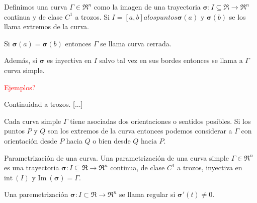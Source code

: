 \begin{definition}
    Definimos una curva $\Gamma\in\Re^n$ como la imagen de una trayectoria $\boldsymbol{\sigma}:I\subseteq\Re\to\Re^n$ continua y de clase $C^1$ a trozos. Si $I=[a,b] a los puntos \boldsymbol{\sigma}(a)$ y $\boldsymbol{\sigma}(b)$ se los llama extremos de la curva.

    Si $\boldsymbol{\sigma}(a)=\boldsymbol{\sigma}(b)$ entonces $\Gamma$ se llama curva cerrada.

    Adem\'as, si $\boldsymbol{\sigma}$ es inyectiva en $I$ salvo tal vez en sus bordes entonces se llama a $\Gamma$ curva simple.
\end{definition}

\textcolor{red}{Ejemplos?}

\begin{definition}
    Continuidad a trozos. [...]
\end{definition}

Cada curva simple $\Gamma$ tiene asociadas dos orientaciones o sentidos posibles. Si los puntos $P$ y $Q$ son los extremos de la curva entonces podemos considerar a $\Gamma$ con orientaci\'on desde $P$ hacia $Q$ o bien desde $Q$ hacia $P$.

\begin{definition}
    Parametrizaci\'on de una curva. Una parametrizaci\'on de una curva simple $\Gamma\in\Re^n$ es una trayectoria $\boldsymbol{\sigma}:I\subseteq\Re\to\Re^n$ continua, de clase $C^1$ a trozos, inyectiva en $\text{int}\:(I)$ y $\text{Im}\:(\boldsymbol{\sigma})=\Gamma$. 
\end{definition}

\begin{definition}
    Una paremetrizaci\'on $\boldsymbol{\sigma}:I\subset\Re\to\Re^n$ se llama regular si $\boldsymbol{\sigma}'(t)\neq0$.
\end{definition}